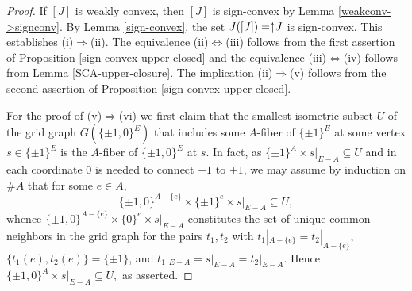 \documentclass[11pt,a4paper]{amsart}
\theoremstyle{definition}
\numberwithin{equation}{section}
\newcommand{\UU}{\ensuremath{U}}
\newcommand{\hcovectors}{J}
\begin{document}
\begin{proof}  If $[\hcovectors]$ is weakly convex, then $[\hcovectors]$
is sign-convex by Lemma \ref{weakconv->signconv}. By Lemma \ref{sign-convex}, the set  $\hcovectors([\hcovectors])=\uparrow\hspace*{-0.1cm}\hcovectors$ is sign-convex. This establishes (i)$\Rightarrow$(ii). The equivalence  (ii)$\Longleftrightarrow$(iii) follows from the first assertion of Proposition \ref{sign-convex-upper-closed} and the equivalence (iii)$\Longleftrightarrow$(iv) follows from Lemma \ref{SCA-upper-closure}.
The implication (ii)$\Rightarrow$(v) follows from the second assertion of Proposition \ref{sign-convex-upper-closed}.



For the proof of (v)$\Rightarrow$(vi) we first claim that the smallest isometric subset $\UU$ of the grid graph $G(\{ \pm 1,0\}^E)$ that includes some $A$-fiber of $\{ \pm 1\}^E$ at some vertex $s\in \{ \pm 1\}^E$ is the $A$-fiber of $\{ \pm 1,0\}^E$ at $s$. In fact, as $\{ \pm 1\}^A\times s|_{E-A}\subseteq {\UU}$ and in
each coordinate 0 is needed to connect $-1$ to $+1$, we may assume by induction on $\# A$ that for some $e\in A,$
$$\{ \pm 1,0\}^{A-\{ e\}}\times \{ \pm 1\}^e\times s|_{E-A}\subseteq {\UU},$$
whence $\{ \pm 1,0\}^{A-\{ e\}}\times \{ 0\}^e\times s|_{E-A}$ constitutes the set of unique common neighbors in the grid graph
for the pairs $t_1,t_2$ with $t_1|_{A-\{ e\}}=t_2|_{A-\{ e\}},$ $\{ t_1(e),t_2(e)\}=\{ \pm 1\}$, and $t_1|_{E-A}=s|_{E-A}=t_2|_{E-A}.$ Hence $\{ \pm 1,0\}^A\times s|_{E-A}\subseteq {\UU},$ as asserted.


\end{proof}
\end{document}
